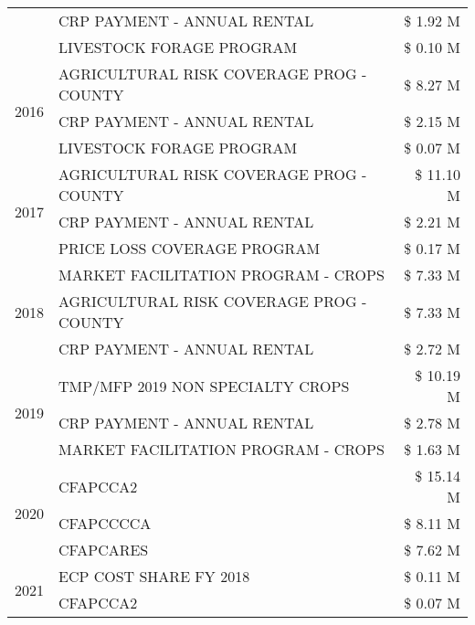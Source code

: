 \begin{tabular}{llr}
 & CRP PAYMENT - ANNUAL RENTAL & \$ 1.92 M \\
 & LIVESTOCK FORAGE PROGRAM & \$ 0.10 M \\
\cline{1-3}
\multirow[t]{3}{*}{2016} & AGRICULTURAL RISK COVERAGE PROG - COUNTY & \$ 8.27 M \\
 & CRP PAYMENT - ANNUAL RENTAL & \$ 2.15 M \\
 & LIVESTOCK FORAGE PROGRAM & \$ 0.07 M \\
\cline{1-3}
\multirow[t]{3}{*}{2017} & AGRICULTURAL RISK COVERAGE PROG - COUNTY & \$ 11.10 M \\
 & CRP PAYMENT - ANNUAL RENTAL & \$ 2.21 M \\
 & PRICE LOSS COVERAGE PROGRAM & \$ 0.17 M \\
\cline{1-3}
\multirow[t]{3}{*}{2018} & MARKET FACILITATION PROGRAM - CROPS & \$ 7.33 M \\
 & AGRICULTURAL RISK COVERAGE PROG - COUNTY & \$ 7.33 M \\
 & CRP PAYMENT - ANNUAL RENTAL & \$ 2.72 M \\
\cline{1-3}
\multirow[t]{3}{*}{2019} & TMP/MFP 2019 NON SPECIALTY CROPS & \$ 10.19 M \\
 & CRP PAYMENT - ANNUAL RENTAL & \$ 2.78 M \\
 & MARKET FACILITATION PROGRAM - CROPS & \$ 1.63 M \\
\cline{1-3}
\multirow[t]{3}{*}{2020} & CFAPCCA2 & \$ 15.14 M \\
 & CFAPCCCCA & \$ 8.11 M \\
 & CFAPCARES & \$ 7.62 M \\
\cline{1-3}
\multirow[t]{2}{*}{2021} & ECP COST SHARE FY 2018 & \$ 0.11 M \\
 & CFAPCCA2 & \$ 0.07 M \\
\cline{1-3}
\bottomrule
\end{tabular}
